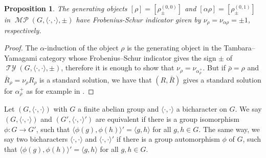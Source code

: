 \documentclass[twoside,11pt,reqno]{amsart}
\newtheorem{prop}[thm]{Proposition}
\theoremstyle{definition}
\theoremstyle{remark}
\DeclareMathOperator*{\TY}{\mathcal{TY}}
\DeclareMathOperator*{\MP}{\mathcal{MP}}
\newcommand{\bi}[2]{\langle #1,#2\rangle}
\newcommand{\bislotslot}{\bi\cdot\cdot}
\begin{document}
\begin{prop}
  \label{prop:FSalpha}
  The generating objects $[\rho]=[\rho^{(0,0)}_\pm]$
  and $[\alpha\rho]=[\rho_\pm^{(0,1)}]$ in $\MP(G,\bislotslot,\pm)$ 
  have Frobenius-Schur indicator given by $\nu_{\rho}=\nu_{\alpha\rho}=\pm1$,
  respectively.
\end{prop}
\begin{proof} 
  The $\alpha$-induction of the object $\rho$ is the generating object in the 
  Tambara--Yamagami category whose Frobenius--Schur indicator gives the sign
  $\pm$ of $\TY(G,\bislotslot,\pm)$, therefore it is enough to show that 
  $\nu_{\rho}=\nu_{\alpha^+_\rho}$.
  But if $\bar\rho=\rho$ and $\bar R_\rho=\nu_\rho R_\rho$ is a standard 
  solution, we have that $(R,\bar R)$ gives a standard solution for 
  $\alpha^+_\rho$ as for example in \cite[Lemma 2.2]{Re2000}.
\end{proof}


Let $(G,{\bislotslot})$ with $G$ a finite abelian group
and ${\bislotslot}$ a bicharacter on $G$.
We say $(G,{\bislotslot})$ and $(G',{\bislotslot}')$ are equivalent
if there is a group isomorphism $\phi\colon G \to G'$, such that
${\bi{\phi(g)}{\phi(h)}}'=\bi gh$ for all $g,h\in G$.
The same way, we say two bicharacters $\bislotslot$ and ${\bislotslot}'$ 
if there is a group automorphism $\phi$ of $G$,
such that
${\bi{\phi(g)}{\phi(h)}}'=\bi gh$ for all $g,h\in G$.
\end{document}
